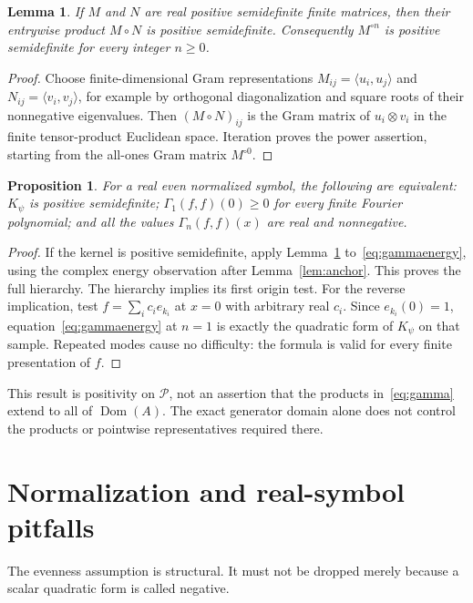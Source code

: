 \documentclass[11pt]{article}
\newtheorem{lemma}[theorem]{Lemma}
\newtheorem{proposition}[theorem]{Proposition}
\theoremstyle{remark}\newtheorem{remark}[theorem]{Remark}
\DeclareMathOperator{\Dom}{Dom}
\begin{document}
\begin{lemma}\label{lem:schur}
If $M$ and $N$ are real positive semidefinite finite matrices,
then their entrywise product $M\circ N$ is positive semidefinite.
Consequently $M^{\circ n}$ is positive semidefinite for every
integer $n\geq0$.
\end{lemma}
\begin{proof}
Choose finite-dimensional Gram representations
$M_{ij}=\langle u_i,u_j\rangle$ and
$N_{ij}=\langle v_i,v_j\rangle$, for example by orthogonal
diagonalization and square roots of their nonnegative eigenvalues.
Then $(M\circ N)_{ij}$ is the Gram matrix of $u_i\otimes v_i$
in the finite tensor-product Euclidean space. Iteration proves
the power assertion, starting from the all-ones Gram matrix
$M^{\circ0}$.
\end{proof}

\begin{proposition}\label{prop:gammapositive}
For a real even normalized symbol, the following are equivalent:
$K_\psi$ is positive semidefinite; $\Gamma_1(f,f)(0)\geq0$
for every finite Fourier polynomial; and all the values
$\Gamma_n(f,f)(x)$ are real and nonnegative.
\end{proposition}
\begin{proof}
If the kernel is positive semidefinite, apply
Lemma~\ref{lem:schur} to~\eqref{eq:gammaenergy}, using the complex
energy observation after Lemma~\ref{lem:anchor}. This proves the
full hierarchy. The hierarchy implies its first origin test.
For the reverse implication, test
$f=\sum_i c_i e_{k_i}$ at $x=0$ with arbitrary real $c_i$.
Since $e_{k_i}(0)=1$, equation~\eqref{eq:gammaenergy} at $n=1$
is exactly the quadratic form of $K_\psi$ on that sample.
Repeated modes cause no difficulty: the formula is valid for
every finite presentation of $f$.
\end{proof}

This result is positivity on $\mathcal P$, not an assertion that
the products in~\eqref{eq:gamma} extend to all of $\Dom(A)$.
The exact generator domain alone does not control the products
or pointwise representatives required there.

\section{Normalization and real-symbol pitfalls}\label{sec:normalization}
The evenness assumption is structural. It must not be dropped
merely because a scalar quadratic form is called negative.
\end{document}

